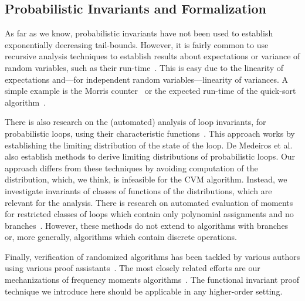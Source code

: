 \subsection{Probabilistic Invariants and Formalization}
As far as we know, probabilistic invariants have not been used to establish exponentially decreasing tail-bounds.
However, it is fairly common to use recursive analysis techniques to establish results about expectations or variance of random variables, such as their run-time~\cite[Section 1.4]{motwani1995}.
This is easy due to the linearity of expectations and---for independent random variables---linearity of variances.
A simple example is the Morris counter~\cite{morris1978} or the expected run-time of the quick-sort algorithm~\cite[Section 2.5]{mitzenmacher2005}.

There is also research on the (automated) analysis of loop invariants, for probabilistic loops, using their characteristic functions~\cite{batz2023, mciver2005}.
This approach works by establishing the limiting distribution of the state of the loop.
De Medeiros et al.~\cite[Section 3.2]{demedeiros2024} also establish methods to derive limiting distributions of probabilistic loops.
Our approach differs from these techniques by avoiding computation of the distribution, which, we think, is infeasible for the CVM algorithm.
Instead, we investigate invariants of classes of functions of the distributions, which are relevant for the analysis.
There is research on automated evaluation of moments for restricted classes of loops which contain only polynomial assignments and no branches~\cite{bartocci2019,kofnov2022}.
However, these methods do not extend to algorithms with branches or, more generally, algorithms which contain discrete operations.

Finally, verification of randomized algorithms has been tackled by various authors using various proof assistants~\cite{bosshard2024,demedeiros2024, eberl2020,gopinathan20,hurd03, Probabilistic_Prime_Tests-AFP, tan2024}.
The most closely related efforts are our mechanizations of frequency moments algorithms~\cite{karayel2022, karayel2023}.
The functional invariant proof technique we introduce here should be applicable in any higher-order setting.
